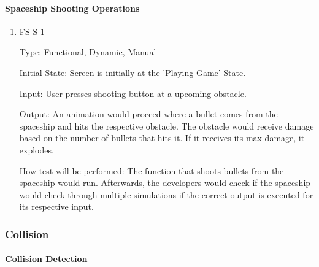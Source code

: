 \documentclass[12pt, titlepage]{article}
\begin{document}
\paragraph{Spaceship Shooting Operations}

\begin{enumerate}

\item{FS-S-1\\}

Type: Functional, Dynamic, Manual
					
Initial State: Screen is initially at the 'Playing Game' State. 
					
Input: User presses shooting button at a upcoming obstacle.
					
Output: An animation would proceed where a bullet comes from the spaceship and hits the respective obstacle. The obstacle would receive damage based on the number of bullets that hits it. If it receives its max damage, it explodes.
					
How test will be performed: The function that shoots bullets from the spaceship would run. Afterwards, the developers would check if the spaceship would check through multiple simulations if the correct output is executed for its respective input. 
					
\end{enumerate}

\subsubsection{Collision}

\paragraph{Collision Detection}
\end{document}
